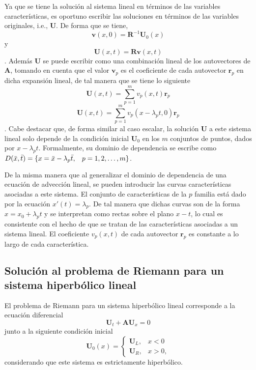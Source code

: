 Ya que se tiene la solución al sistema lineal en términos de las variables características, es oportuno escribir las soluciones en términos de las variables originales, i.e., $\mathbf{U}$. De forma que se tiene,
\begin{equation}
	\mathbf{v}(x,0) = \mathbf{R}^{-1} \mathbf{U}_0(x)
\end{equation}
y
\begin{equation}
	\mathbf{U}(x,t) = \mathbf{R} \mathbf{v}(x,t)
\end{equation}. Además $\mathbf{U}$ se puede escribir como una combinación lineal de los autovectores de $\mathbf{A}$, tomando en cuenta que el valor $\mathbf{v}_p$ es el coeficiente de cada autovector $\mathbf{r}_p$ en dicha expansión lineal, de tal manera que se tiene lo siguiente
\begin{equation}
	\mathbf{U}(x,t) = \sum_{p=1}^{m} v_p(x,t) \mathbf{r}_p
	\label{eq:sol-linear-sys}
\end{equation}
\begin{equation}
	\mathbf{U}(x,t) = \sum_{p=1}^{m} v_p(x - \lambda_p t, 0) \mathbf{r}_p
	\label{eq:sol-linear-sys-con-caracteristicas}
\end{equation}. Cabe destacar que, de forma similar al caso escalar, la solución $\mathbf{U}$ a este sistema lineal solo depende de la condición inicial $\mathbf{U}_0$ en los $m$ conjuntos de puntos, dados por $x - \lambda_p t$. Formalmente, su dominio de dependencia se escribe como $D(\bar{x}, \bar{t}) = \{x = \bar{x} - \lambda_{p} \bar{t}, \hspace{3mm} p = 1,2, \dots, m \}$.

De la misma manera que al generalizar el dominio de dependencia de una ecuación de advección lineal, se pueden introducir las curvas características asociadas a este sistema. El conjunto de características de la $p$ familia está dado por la ecuación $x'(t)=\lambda_{p}$. De tal manera que dichas curvas son de la forma $x = x_0 + \lambda_{p}t$ y se interpretan como rectas sobre el plano $x-t$, lo cual es consistente con el hecho de que se tratan de las características asociadas a un sistema lineal. El coeficiente $v_p(x,t)$ de cada autovector $\mathbf{r}_p$ es constante a lo largo de cada característica.

\subsection{Solución al problema de Riemann para un sistema hiperbólico lineal}
El problema de Riemann para un sistema hiperbólico lineal corresponde a la ecuación diferencial
\begin{equation}
	\mathbf{U}_t + \mathbf{A}\mathbf{U}_x = 0
\end{equation}
junto a la siguiente condición inicial
\begin{equation}
	\mathbf{U}_{0}(x) = 
	\begin{cases}
		\mathbf{U}_L, & x < 0 \\
		\mathbf{U}_R, & x > 0,
	\end{cases}
\end{equation}
considerando que este sistema es estrictamente hiperbólico.

